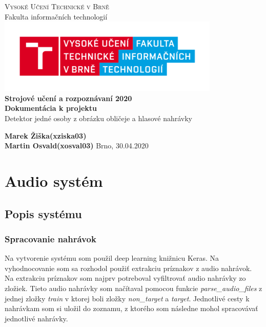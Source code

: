 \documentclass{article}
\begin{document}

	\begin{titlepage}
		\begin{center}
			\textsc{\Huge Vysoké Učení Technické v Brně} \\[0.7cm]
			{\Huge Fakulta informačních technologií}
			\center\includegraphics[width=0.5\linewidth]{./logo.png}\\[5cm]

            \textbf{{\Huge Strojové učení a rozpoznávaní 2020}}\\[0.5cm]

			\textbf{{\huge Dokumentácia k projektu}}\\[0.4cm]
			\LARGE{Detektor jedné osoby z obrázku obličeje a hlasové
nahrávky}\\
			
		\end{center}
		\vfill

		\begin{flushleft}
			\begin{Large}
				\textbf{Marek Žiška}\hspace{44px}\textbf{(xziska03)}\\[0.25cm]
				\textbf{Martin Osvald}\hspace{30px}\textbf{(xosval03)}
			\hfill
			Brno, 30.04.2020
			\end{Large}
		\end{flushleft}

	\end{titlepage}
    \newpage
    \section{Audio systém}
    \subsection{Popis systému}
    \subsubsection{Spracovanie nahrávok}
    \Large{Na vytvorenie systému som použil deep learning knižnicu Keras. Na vyhodnocovanie som sa rozhodol použiť extrakciu príznakov z audio nahrávok. Na extrakciu príznakov som najprv potreboval vyfiltrovať audio nahrávky zo zložiek. Tieto audio nahrávky som načítaval pomocou funkcie \textit{parse\_audio\_files} z jednej zložky \textit{train} v ktorej boli zložky \textit{non\_target} a \textit{target}. Jednotlivé cesty k nahrávkam som si uložil do zoznamu, z ktorého som následne mohol spracovávať jednotlivé nahrávky.}
\end{document}
